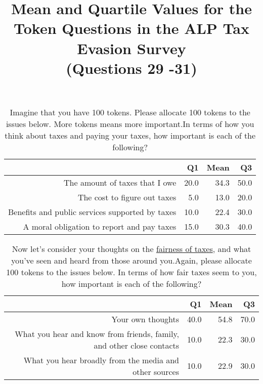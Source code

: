 \documentclass{NSF_proposal_mod}
\begin{document}
\title{Mean and Quartile Values for the Token Questions in the ALP Tax Evasion Survey\\(Questions 29 -31)}
\maketitle
{}

\begin{table}[ht]
\centering
\begin{tabular}{rrrr}
  \hline
 & Q1 & Mean & Q3 \\ 
  \hline
The amount of taxes that I owe & 20.0 & 34.3 & 50.0 \\ 
  The cost to figure out taxes & 5.0 & 13.0 & 20.0 \\ 
  Benefits and public services supported by taxes & 10.0 & 22.4 & 30.0 \\ 
  A moral obligation to report and pay taxes & 15.0 & 30.3 & 40.0 \\ 
   \hline
\end{tabular}
\caption{Imagine that you have 100 tokens. Please allocate 100 tokens to the issues below. 
More tokens means more important.In terms of how you think about taxes and paying your taxes, how 
       important is each of the following?} 
\end{table}

\vspace{18pt}

\begin{table}[ht]
\centering
\begin{tabular}{rrrr}
  \hline
 & Q1 & Mean & Q3 \\ 
  \hline
	Your own thoughts & 40.0 & 54.8 & 70.0 \\ 
  What you hear and know from friends, family, and other close contacts & 10.0 & 22.3 & 30.0 \\ 
  What you hear broadly from the media and other sources & 10.0 & 22.9 & 30.0 \\ 
   \hline
\end{tabular}
\caption{Now let's consider your thoughts on the \underline{fairness of taxes}, and what 
you've seen and heard from those around you.Again, please allocate 100 tokens to the issues below.  
In terms of how fair taxes seem to you, how important is each of the following?} 
\end{table}

\vspace{18pt}
\end{document}
